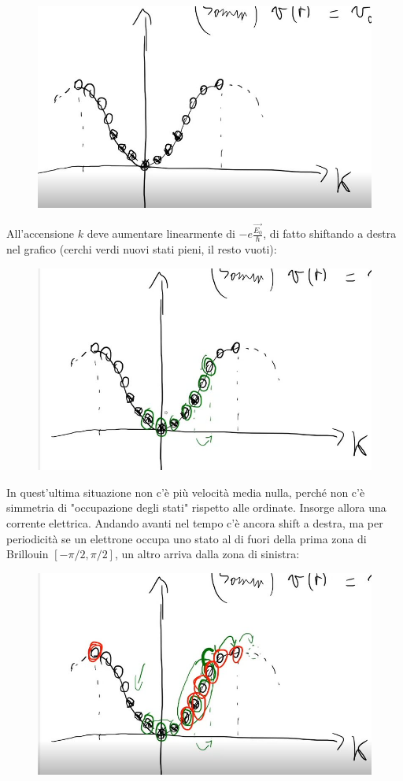 \documentclass{book}
\begin{document}
                        \begin{figure}[h!]
                            \centering
                            \includegraphics[width=0.5\linewidth]{img/plotLez21.png}
                        \end{figure}
                        All'accensione $k$ deve aumentare linearmente di $-e \frac{\vec{E_{0}}}{\hbar}$, di fatto shiftando a destra nel grafico (cerchi verdi nuovi stati pieni, il resto vuoti):
                        \begin{figure}[h!]
                            \centering
                            \includegraphics[width=0.5\linewidth]{img/plot2lez21.png}
                        \end{figure}
                        In quest'ultima situazione non c'è più velocità media nulla, perché non c'è simmetria di "occupazione degli stati" rispetto alle ordinate. Insorge allora una corrente elettrica. Andando avanti nel tempo c'è ancora shift a destra, ma per periodicità se un elettrone occupa uno stato al di fuori della prima zona di Brillouin $[-\pi/2, \pi/2]$, un altro arriva dalla zona di sinistra:
                        \begin{figure}[h!]
                            \centering
                            \includegraphics[width=0.5\linewidth]{img/plot3lez21.png}
                        \end{figure}
\end{document}
